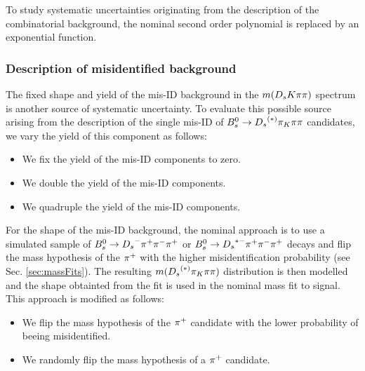To study systematic uncertainties originating from the description of the combinatorial background, the nominal second order polynomial is replaced by an exponential function. 

\subsubsection{Description of misidentified background}

The fixed shape and yield of the mis-ID background in the $m({{D}_{s}}{K}{\pi}{\pi})$ spectrum is another source of systematic uncertainty.
To evaluate this possible source arising from the description of the single mis-ID of ${{B}^0_{s}}\rightarrow{\ensuremath{{D}_{s}}}^{(*)}{\pi}_{{K}}{\pi}{\pi}$ candidates, we vary the yield of this component as follows:

\begin{itemize}
 
\item We fix the yield of the mis-ID components to zero.

\item We double the yield of the mis-ID components.

\item We quadruple the yield of the mis-ID components.

\end{itemize}

For the shape of the mis-ID background, 
the nominal approach is to use a simulated sample of ${{B}^0_{s}}\rightarrow{\ensuremath{{D}_{s}}}^{-}{{\pi}^+}{{\pi}^-}{{\pi}^+}$ or ${{B}^0_{s}}\rightarrow{\ensuremath{{D}_{s}}}^{*-}{{\pi}^+}{{\pi}^-}{{\pi}^+}$ 
decays and flip the mass hypothesis of the ${{\pi}^+}$ with the higher misidentification probability (see Sec. \ref{sec:massFits}). 
The resulting $m({{D}_{s}}^{(*)}{\pi}_{{K}}{\pi}{\pi})$ distribution is then modelled and the shape obtainted from the fit is used in the nominal mass fit to signal. This approach is modified as follows:

\begin{itemize}

\item We flip the mass hypothesis of the ${{\pi}^+}$ candidate with the lower probability of beeing misidentified. 

\item We randomly flip the mass hypothesis of a ${{\pi}^+}$ candidate.

\end{itemize}

